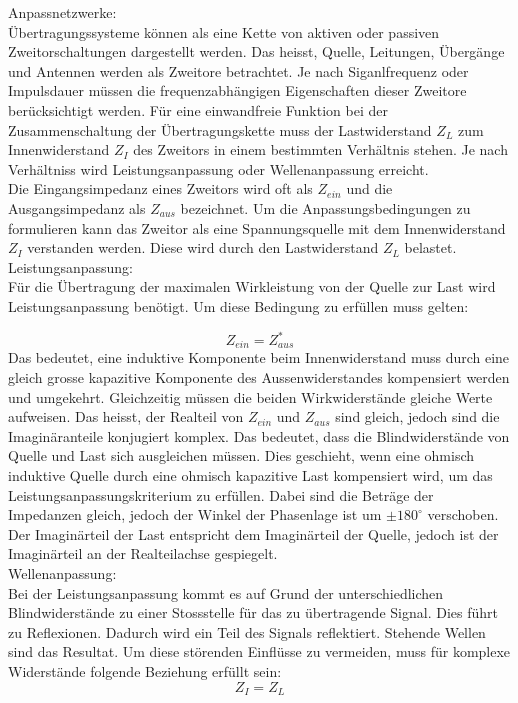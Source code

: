 Anpassnetzwerke: \\
Übertragungssysteme können als eine Kette von aktiven oder passiven  Zweitorschaltungen dargestellt werden. Das heisst, Quelle, Leitungen, Übergänge und Antennen werden als Zweitore betrachtet. Je nach Siganlfrequenz oder Impulsdauer müssen die frequenzabhängigen Eigenschaften dieser Zweitore berücksichtigt werden. Für eine einwandfreie Funktion bei der Zusammenschaltung der Übertragungskette muss der Lastwiderstand $Z_L$ zum Innenwiderstand $Z_I$ des Zweitors in einem bestimmten Verhältnis stehen. Je nach Verhältniss wird Leistungsanpassung oder Wellenanpassung erreicht. \\
Die Eingangsimpedanz eines Zweitors wird oft als $Z_{ein}$ und die Ausgangsimpedanz als $Z_{aus}$ bezeichnet. 
Um die Anpassungsbedingungen zu formulieren kann das Zweitor als eine Spannungsquelle mit dem Innenwiderstand $Z_I$ verstanden werden. Diese wird  durch den Lastwiderstand $Z_L$ belastet.\\

Leistungsanpassung: \\
Für die Übertragung der maximalen Wirkleistung von der Quelle zur Last  wird Leistungsanpassung benötigt. Um diese Bedingung zu erfüllen muss gelten:

\[Z_{ein} = Z_{aus}^*\]
Das bedeutet, eine induktive Komponente beim Innenwiderstand muss  durch eine gleich grosse kapazitive Komponente des Aussenwiderstandes kompensiert werden und umgekehrt. Gleichzeitig müssen die beiden Wirkwiderstände gleiche Werte aufweisen. Das heisst, der Realteil von $Z_{ein}$ und $Z_{aus}$ sind gleich, jedoch sind die Imaginäranteile konjugiert komplex. Das bedeutet, dass die Blindwiderstände von Quelle und Last sich ausgleichen müssen. Dies geschieht, wenn eine ohmisch induktive Quelle durch eine ohmisch kapazitive Last kompensiert wird, um das Leistungsanpassungskriterium zu erfüllen. Dabei sind die Beträge der Impedanzen gleich, jedoch der Winkel der Phasenlage ist um $\pm 180^\circ$  verschoben. Der Imaginärteil der Last entspricht dem Imaginärteil der Quelle, jedoch ist der Imaginärteil an der Realteilachse gespiegelt.\\

Wellenanpassung: \\
Bei der Leistungsanpassung kommt es auf Grund der unterschiedlichen Blindwiderstände zu einer Stossstelle für das zu übertragende Signal. Dies führt zu Reflexionen. Dadurch wird  ein Teil des Signals reflektiert. Stehende Wellen sind das Resultat. Um diese störenden Einflüsse zu vermeiden, muss für komplexe Widerstände folgende Beziehung erfüllt sein:
\[Z_{I} = Z_{L}\]

